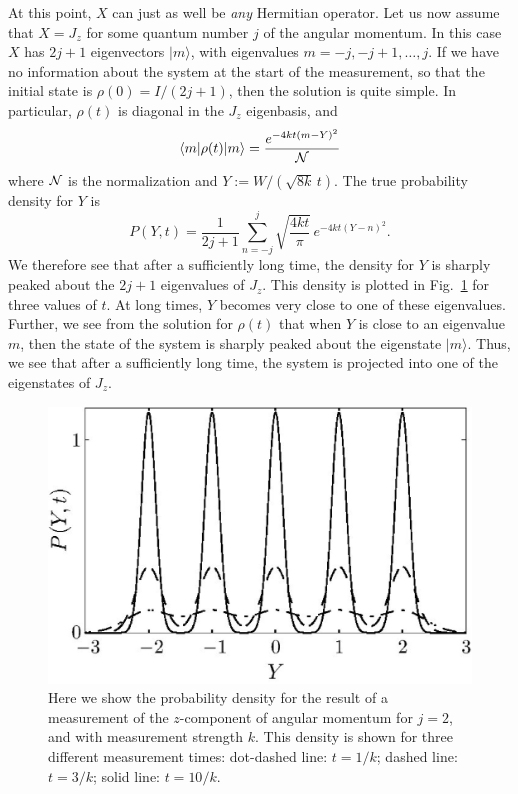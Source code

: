 \documentclass[12pt,aps,onecolum,superscriptaddress,footinbib,floatfix,showpacs]{revtex4-1}
\begin{document}
At this point, $X$ can just as well be \textit{any} Hermitian operator. Let us now assume
that $X = J_z$ for some quantum number $j$ of the angular momentum. In this
case $X$ has $2j + 1$ eigenvectors $|m\rangle$, with
eigenvalues $m = -j,-j+1, \ldots, j$. If 
we have no information about the system
at the start of the measurement,
so that the
initial state is $\rho(0) = I/(2j+1)$, then the solution is quite
simple. In particular, $\rho(t)$ is diagonal in the $J_z$
eigenbasis, and
\begin{equation}
  \langle m |\rho(t)| m \rangle = \frac{e^{-4kt(m-Y)^2}}{\cal N}
\end{equation}
where ${\cal N}$ is the normalization and 
$Y:=W/(\sqrt{8k}\,t)$. The true probability density for $Y$ is
\begin{equation}
  P(Y,t) = \frac{1}{2j+1}\sum_{n=-j}^j \sqrt{\frac{4kt}{\pi}}\,e^{-4kt(Y-n)^2} .
\end{equation}
We therefore see that after a sufficiently long time, the density
for $Y$ is sharply peaked about the $2j+1$ eigenvalues of $J_z$. 
This density is plotted in Fig.~\ref{fig:msolution} for three values of $t$.
At long times, $Y$ becomes very close to one of these
eigenvalues. Further, we see from the solution for $\rho(t)$ that
when $Y$ is close to an eigenvalue $m$, then the state of the
system is sharply peaked about the eigenstate $|m\rangle$. Thus, we
see that after a sufficiently long time, the system is projected
into one of the eigenstates of $J_z$.

\begin{figure}[tb]
  \begin{center}
     \includegraphics[width=.5\hsize]{jcpfig1_mod.bmap.250.eps}
  \end{center}
  \vspace{-5mm}
  \caption
         {Here we show the probability density for the result of a measurement 
          of the $z$-component of angular momentum for $j=2$, and with 
          measurement strength $k$. This density 
          is shown for three different measurement times: dot-dashed line: $t = 1/k$; 
          dashed line: $t=3/k$; solid line: $t = 10/k$. 
	\label{fig:msolution}}
\end{figure}
\end{document}
